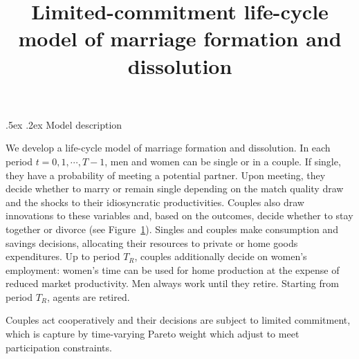 \documentclass[12pt]{article}
\makeatletter
\numberwithin{table}{section}
\renewcommand\section{\@startsection{section}{1}{0cm}{-1.5ex \@plus
		-.2ex \@minus -.2ex}%
	{.5ex \@plus.2ex} {\normalfont\large\bfseries}}
\makeatother
\begin{document}
\title{Limited-commitment life-cycle model of marriage formation and dissolution}
\author{}

\maketitle

\section{Model description}

We develop a life-cycle model of marriage formation and dissolution. In each period $t=0,1,\cdots,T-1$, men and women can be single or in a couple. If single, they have a probability of meeting a potential partner. Upon meeting, they decide whether to marry or remain single depending on the match quality draw and the shocks to their idiosyncratic productivities. Couples also draw innovations to these variables and, based on the outcomes, decide whether to stay together or divorce (see Figure~\ref{fig:scheme}). Singles and couples make consumption and savings decisions, allocating their resources to private or home goods expenditures. Up to period $T_R$, couples additionally decide on women's employment: women's time can be used for home production at the expense of reduced market productivity. Men always work until they retire. Starting from period $T_R$, agents are retired. 

\begin{figure}[h!]\centering
	\caption{}
	\label{fig:scheme}
	\resizebox{0.5\textwidth}{!}{}
\end{figure}

Couples act cooperatively and their decisions are subject to limited commitment, which is capture by time-varying Pareto weight which adjust to meet participation constraints. 
\end{document}
